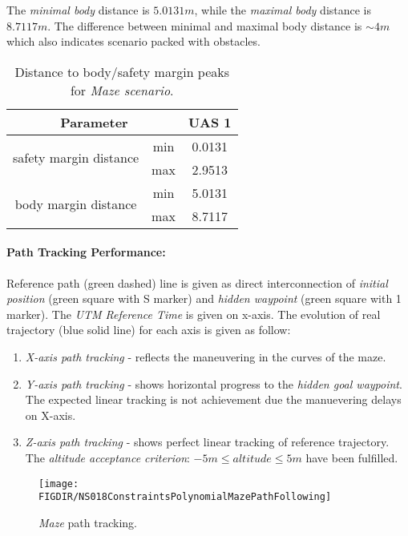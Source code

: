 The \emph{minimal body} distance is $5.0131 m$, while the \emph{maximal body} distance is $8.7117 m$. The difference between minimal and maximal body distance is $\sim 4 m$ which also indicates scenario packed with obstacles. 

\begin{table}[H]
    \centering
    \begin{tabular}{c|c||c}
    \multicolumn{2}{c||}{Parameter} & UAS 1 \\\hline\hline
    \multirow{2}{*}{safety margin distance} & min & 0.0131 \\\cline{2-3}
                                            & max & 2.9513 \\\hline
    \multirow{2}{*}{body margin distance}   & min & 5.0131 \\\cline{2-3}
                                            & max & 8.7117 
    \end{tabular}
    \caption{Distance to body/safety margin peaks for \emph{Maze scenario}.}
    \label{tab:testCaseMazeSafetyAndBodyMarginDistances}
\end{table}

\paragraph{Path Tracking Performance:} Reference path (green dashed) line is given as direct interconnection of \emph{initial position} (green square with S marker) and \emph{hidden waypoint} (green square with 1 marker). The \emph{UTM Reference Time} is given on x-axis. The evolution of real trajectory (blue solid line) for each axis is given as follow:

\begin{enumerate}
    \item \emph{X-axis path tracking} - reflects the maneuvering in the curves of the maze.
    
    \item \emph{Y-axis path tracking} - shows horizontal progress to the \emph{hidden goal waypoint}. The expected linear tracking is not achievement due the manuevering delays on X-axis.
    
    \item \emph{Z-axis path tracking} - shows perfect linear tracking of reference trajectory. The \emph{altitude acceptance criterion}: $-5m \le altitude \le 5m$ have been fulfilled.
\end{enumerate}

\begin{figure}[H]
    \centering
    \texttt{[image: \\FIGDIR/NS018ConstraintsPolynomialMazePathFollowing]} 
    \caption{\emph{Maze} path tracking.}
    \label{fig:testCaseMazePathTracking}
\end{figure}


